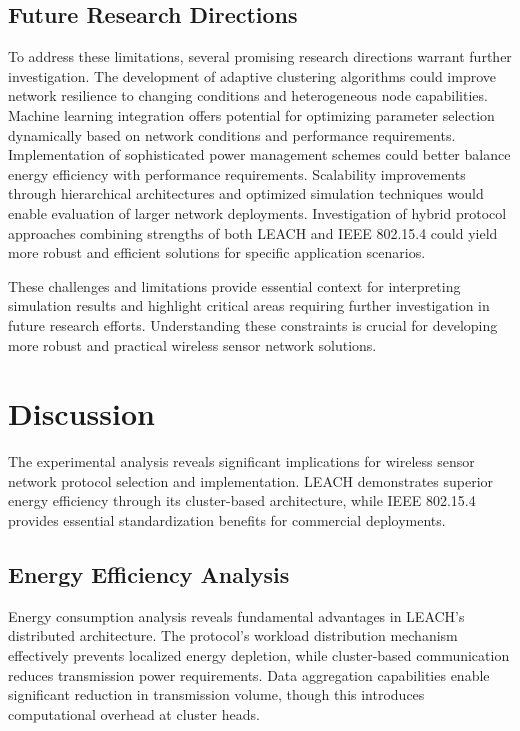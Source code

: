 \documentclass[conference]{IEEEtran}
\begin{document}
\subsection{Future Research Directions}
To address these limitations, several promising research directions warrant further investigation. The development of adaptive clustering algorithms could improve network resilience to changing conditions and heterogeneous node capabilities. Machine learning integration offers potential for optimizing parameter selection dynamically based on network conditions and performance requirements. Implementation of sophisticated power management schemes could better balance energy efficiency with performance requirements. Scalability improvements through hierarchical architectures and optimized simulation techniques would enable evaluation of larger network deployments. Investigation of hybrid protocol approaches combining strengths of both LEACH and IEEE 802.15.4 could yield more robust and efficient solutions for specific application scenarios.

These challenges and limitations provide essential context for interpreting simulation results and highlight critical areas requiring further investigation in future research efforts. Understanding these constraints is crucial for developing more robust and practical wireless sensor network solutions.
\section{Discussion}
The experimental analysis reveals significant implications for wireless sensor network protocol selection and implementation. LEACH demonstrates superior energy efficiency through its cluster-based architecture, while IEEE 802.15.4 provides essential standardization benefits for commercial deployments.

\subsection{Energy Efficiency Analysis}
Energy consumption analysis reveals fundamental advantages in LEACH's distributed architecture. The protocol's workload distribution mechanism effectively prevents localized energy depletion, while cluster-based communication reduces transmission power requirements. Data aggregation capabilities enable significant reduction in transmission volume, though this introduces computational overhead at cluster heads.
\end{document}
